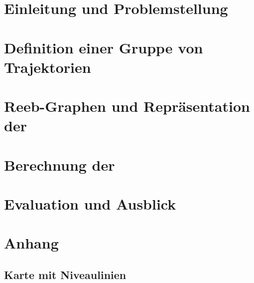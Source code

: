 




\tableofcontents

\cleardoubleoddemptypage%
\setcounter{page}{1}
\setcounter{footnote}{0}

\chapter{Einleitung und Problemstellung}%
\label{cha:einleitung}


\chapter{Definition einer Gruppe von Trajektorien}%
\label{cha:def_gruppe}


\chapter{Reeb-Graphen und Repräsentation der \GrpStruktur}%
\label{cha:reeb_graphen}


\chapter{Berechnung der \GrpStruktur}%
\label{cha:berechnung}


\chapter{Evaluation und Ausblick}%
\label{cha:eval}









\cleardoubleoddemptypage%
\setcounter{page}{1}
\appendix
\chapter{Anhang}%
\label{cha:anhang}
\section{Karte mit Niveaulinien}%
\label{sec:karte_niveau}

\printindex
\listoffigures
\printbibliography%
\todototoc%

